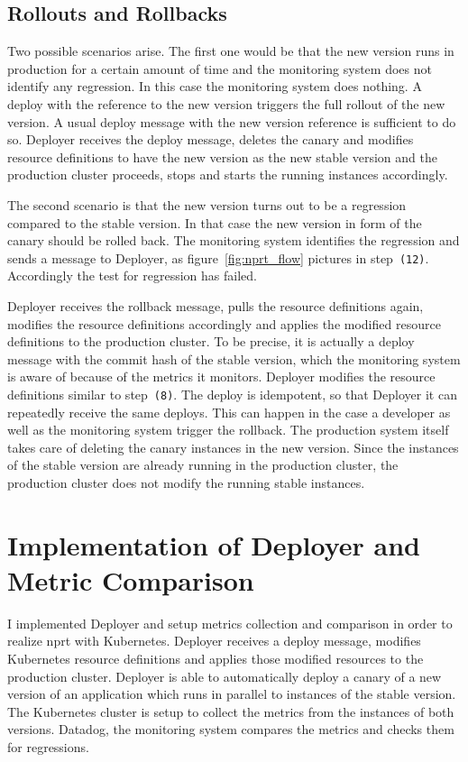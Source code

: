 \section{Rollouts and Rollbacks}

Two possible scenarios arise. The first one would be that the new version runs in
production for a certain amount of time and the monitoring system does not identify any
regression. In this case the monitoring system does nothing. A deploy with the reference
to the new version triggers the full rollout of the new version. A usual deploy message
with the new version reference is sufficient to do so. Deployer receives the deploy
message, deletes the canary and modifies resource definitions to have the new version as
the new stable version and the production cluster proceeds, stops and starts the running
instances accordingly.

The second scenario is that the new version turns out to be a regression compared to the
stable version. In that case the new version in form of the canary should be rolled
back. The monitoring system identifies the regression and sends a message to Deployer, as
figure~\ref{fig:nprt_flow} pictures in step~\texttt{(12)}. Accordingly the test for
regression has failed.

Deployer receives the rollback message, pulls the resource definitions again, modifies the
resource definitions accordingly and applies the modified resource definitions to the
production cluster. To be precise, it is actually a deploy message with the commit
hash of the stable version, which the monitoring system is aware of because of the metrics
it monitors. Deployer modifies the resource definitions similar to step~\texttt{(8)}. The
deploy is idempotent, so that Deployer it can repeatedly receive the same deploys. This
can happen in the case a developer as well as the monitoring system trigger the
rollback. The production system itself takes care of deleting the canary instances in the
new version. Since the instances of the stable version are already running in the
production cluster, the production cluster does not modify the running stable instances.

\chapter{Implementation of Deployer and Metric Comparison}
\label{chap:detail}

I implemented Deployer and setup metrics collection and comparison in order to realize
\gls{nprt} with Kubernetes. Deployer receives a deploy message, modifies Kubernetes
resource definitions and applies those modified resources to the production
cluster. Deployer is able to automatically deploy a canary of a new version of an
application which runs in parallel to instances of the stable version. The Kubernetes
cluster is setup to collect the metrics from the instances of both versions. Datadog, the
monitoring system compares the metrics and checks them for regressions.

